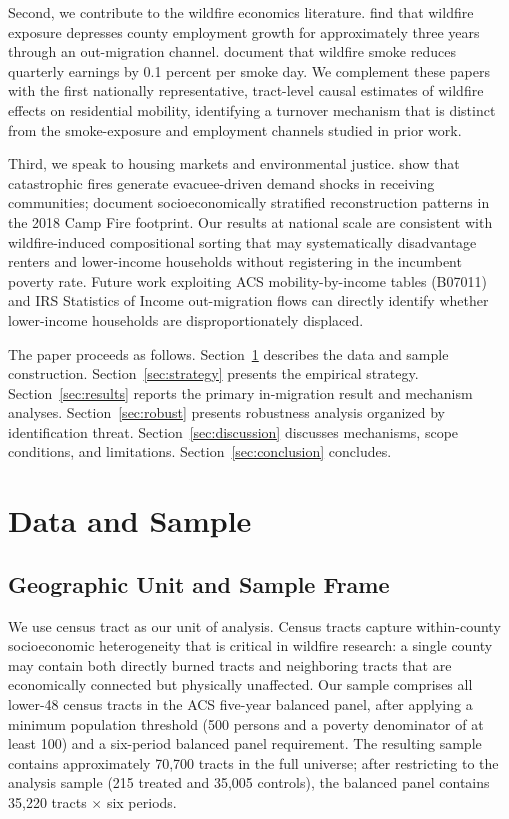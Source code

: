 \documentclass[12pt]{article}
\begin{document}
Second, we contribute to the wildfire economics literature.
\citet{coulombe2025fires} find that wildfire exposure depresses county
employment growth for approximately three years through an out-migration
channel.
\citet{borgschulte2024air} document that wildfire smoke reduces quarterly
earnings by 0.1 percent per smoke day.
We complement these papers with the first nationally representative,
tract-level causal estimates of wildfire effects on residential mobility,
identifying a turnover mechanism that is distinct from the smoke-exposure
and employment channels studied in prior work.

Third, we speak to housing markets and environmental justice.
\citet{hennighausen2024catastrophic} show that catastrophic fires
generate evacuee-driven demand shocks in receiving communities;
\citet{mcconnell2024post} document socioeconomically stratified
reconstruction patterns in the 2018 Camp Fire footprint.
Our results at national scale are consistent with wildfire-induced
compositional sorting that may systematically disadvantage renters
and lower-income households without registering in the incumbent
poverty rate.
Future work exploiting ACS mobility-by-income tables (B07011) and
IRS Statistics of Income out-migration flows can directly identify
whether lower-income households are disproportionately displaced.

The paper proceeds as follows.
Section~\ref{sec:data} describes the data and sample construction.
Section~\ref{sec:strategy} presents the empirical strategy.
Section~\ref{sec:results} reports the primary in-migration result
and mechanism analyses.
Section~\ref{sec:robust} presents robustness analysis organized by
identification threat.
Section~\ref{sec:discussion} discusses mechanisms, scope conditions,
and limitations.
Section~\ref{sec:conclusion} concludes.


\section{Data and Sample}
\label{sec:data}

\subsection{Geographic Unit and Sample Frame}

We use census tract as our unit of analysis.
Census tracts capture within-county socioeconomic heterogeneity
that is critical in wildfire research: a single county may contain
both directly burned tracts and neighboring tracts that are
economically connected but physically unaffected.
Our sample comprises all lower-48 census tracts in the ACS five-year
balanced panel, after applying a minimum population threshold
(500 persons and a poverty denominator of at least 100)
and a six-period balanced panel requirement.
The resulting sample contains approximately 70,700 tracts in the full universe;
after restricting to the analysis sample (215 treated and 35,005 controls),
the balanced panel contains 35,220 tracts $\times$ six periods.
\end{document}
